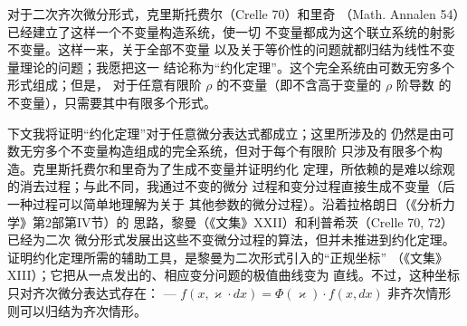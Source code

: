 对于二次齐次微分形式，克里斯托费尔（Crelle 70）和里奇
（Math. Annalen 54）已经建立了这样一个不变量构造系统，使一切
不变量都成为这个联立系统的射影不变量。这样一来，关于全部不变量
以及关于等价性的问题就都归结为线性不变量理论的问题；我愿把这一
结论称为“约化定理”。这个完全系统由可数无穷多个形式组成；但是，
对于任意有限阶 \(\rho\) 的不变量（即不含高于变量的 \(\rho\) 阶导数
的不变量），只需要其中有限多个形式。

下文我将证明“约化定理”对于任意微分表达式都成立；这里所涉及的
仍然是由可数无穷多个不变量构造组成的完全系统，但对于每个有限阶
只涉及有限多个构造。克里斯托费尔和里奇为了生成不变量并证明约化
定理，所依赖的是难以综观的消去过程；与此不同，我通过不变的微分
过程和变分过程直接生成不变量（后一种过程可以简单地理解为关于
其他参数的微分过程）。沿着拉格朗日（《分析力学》第2部第IV节）的
思路，黎曼（《文集》XXII）和利普希茨（Crelle 70, 72）已经为二次
微分形式发展出这些不变微分过程的算法，但并未推进到约化定理。
证明约化定理所需的辅助工具，是黎曼为二次形式引入的“正规坐标”
（《文集》XIII）；它把从一点发出的、相应变分问题的极值曲线变为
直线。不过，这种坐标只对齐次微分表达式存在：
--- \(f(x,\varkappa\cdot dx)=\Phi(\varkappa)\cdot f(x,dx)\)
非齐次情形则可以归结为齐次情形。

